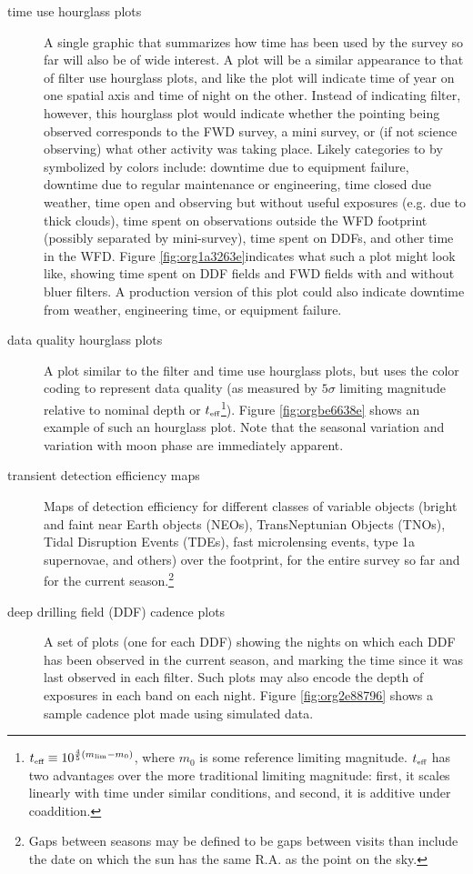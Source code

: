 \begin{description}
\item[{time use hourglass plots}] A single graphic that summarizes how time has been used by the survey so far will also be of wide interest. A plot will be a similar appearance to that of filter use hourglass plots, and like the plot will indicate time of year on one spatial axis and time of night on the other. Instead of indicating filter, however, this hourglass plot would indicate whether the pointing being observed corresponds to the FWD survey, a mini survey, or (if not science observing) what other activity was taking place. Likely categories to by symbolized by colors include: downtime due to equipment failure, downtime due to regular maintenance or engineering, time closed due weather, time open and observing but without useful exposures (e.g. due to thick clouds), time spent on observations outside the WFD footprint (possibly separated by mini-survey), time spent on DDFs, and other time in the WFD. Figure \ref{fig:org1a3263e}indicates what such a plot might look like, showing time spent on DDF fields and FWD fields with and without bluer filters. A production version of this plot could also indicate downtime from weather, engineering time, or equipment failure.
\item[{data quality hourglass plots}] A plot similar to the filter and time use hourglass plots, but uses the color coding to represent data quality (as measured by \(5\sigma\) limiting magnitude relative to nominal depth or \(t_{\mbox{\tiny eff}}\)\footnote{\(t_{\mbox{\tiny eff}} \equiv 10^{\frac{4}{5}(m_{\mbox{\tiny lim}} - m_{0})}\), where \(m_{0}\) is some reference limiting magnitude. \(t_{\mbox{\tiny eff}}\) has two advantages over the more traditional limiting magnitude: first, it scales linearly with time under similar conditions, and second, it is additive under coaddition.}). Figure \ref{fig:orgbe6638e} shows an example of such an hourglass plot. Note that the seasonal variation and variation with moon phase are immediately apparent.
\item[{transient detection efficiency maps}] Maps of detection efficiency for different classes of variable objects (bright and faint near Earth objects (NEOs), TransNeptunian Objects (TNOs), Tidal Disruption Events (TDEs), fast microlensing events, type 1a supernovae, and others) over the footprint, for the entire survey so far and for the current season.\footnote{Gaps between seasons may be defined to be gaps between visits than include the date on which the sun has the same R.A. as the point on the sky.}
\item[{deep drilling field (DDF) cadence plots}] A set of plots (one for each DDF) showing the nights on which each DDF has been observed in the current season, and marking the time since it was last observed in each filter. Such plots may also encode the depth of exposures in each band on each night. Figure \ref{fig:org2e88796} shows a sample cadence plot made using simulated data.

\end{description}
